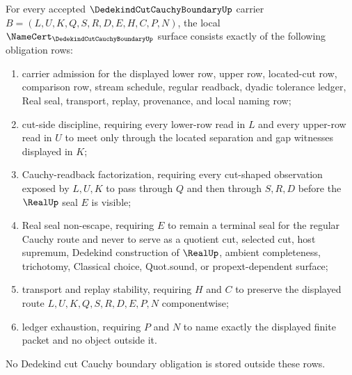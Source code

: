 
\begin{theorem}
\label{thm:dedekind-cut-cauchy-boundary-namecert-obligations}
For every accepted $\DedekindCutCauchyBoundaryUp$ carrier $B=(L,U,K,Q,S,R,D,E,H,C,P,N)$, the local $\NameCert_{\DedekindCutCauchyBoundaryUp}$ surface consists exactly of the following obligation rows:
\begin{enumerate}
\item carrier admission for the displayed lower row, upper row, located-cut row, comparison row, stream schedule, regular readback, dyadic tolerance ledger, Real seal, transport, replay, provenance, and local naming row;
\item cut-side discipline, requiring every lower-row read in $L$ and every upper-row read in $U$ to meet only through the located separation and gap witnesses displayed in $K$;
\item Cauchy-readback factorization, requiring every cut-shaped observation exposed by $L,U,K$ to pass through $Q$ and then through $S,R,D$ before the $\RealUp$ seal $E$ is visible;
\item Real seal non-escape, requiring $E$ to remain a terminal seal for the regular Cauchy route and never to serve as a quotient cut, selected cut, host supremum, Dedekind construction of $\RealUp$, ambient completeness, trichotomy, Classical choice, Quot.sound, or propext-dependent surface;
\item transport and replay stability, requiring $H$ and $C$ to preserve the displayed route $L,U,K,Q,S,R,D,E,P,N$ componentwise;
\item ledger exhaustion, requiring $P$ and $N$ to name exactly the displayed finite packet and no object outside it.
\end{enumerate}
No Dedekind cut Cauchy boundary obligation is stored outside these rows.
\end{theorem}
